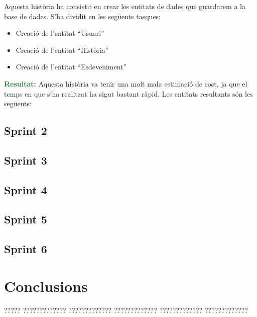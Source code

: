 \documentclass[11pt,catalan,listoffigures,listoftables]{tfgetsinf}
\begin{document}
Aquesta història ha consistit en crear les entitats de dades que guardarem a la base de dades. S’ha dividit en les següents tasques:
\begin{itemize}
	\item Creació de l’entitat “Usuari”
	\item Creació de l’entitat “Història”
	\item Creació de l’entitat “Esdeveniment”
\end{itemize}
\textcolor{forestgreen}{\textbf{Resultat:}} Aquesta història va tenir una molt mala estimació de cost, ja que el temps en que s’ha realitzat ha sigut bastant ràpid. Les entitats resultants són les següents:

\section{Sprint 2}

\section{Sprint 3}

\section{Sprint 4}

\section{Sprint 5}

\section{Sprint 6}


\chapter{Conclusions}

????? ????????????? ????????????? ????????????? ????????????? ????????????? 

\end{document}
